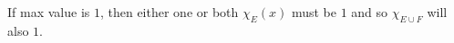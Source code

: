 \documentclass[preview]{standalone}
\begin{document}
\begin{center}
If max value is $1$, then either one or both $\chi_{E}(x)$ must be $1$ and so $\chi_{E \cup F}$ will also $1$.
\end{center}
\end{document}
